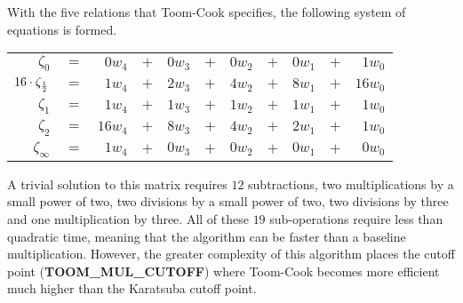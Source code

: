 \documentclass[b5paper]{book}
\begin{document}
With the five relations that Toom-Cook specifies, the following system of equations is formed.

\begin{center}
\begin{tabular}{rcrcrcrcrcr}
$\zeta_0$                    & $=$ & $0w_4$ & $+$ & $0w_3$ & $+$ & $0w_2$ & $+$ & $0w_1$ & $+$ & $1w_0$  \\
$16 \cdot \zeta_{1 \over 2}$ & $=$ & $1w_4$ & $+$ & $2w_3$ & $+$ & $4w_2$ & $+$ & $8w_1$ & $+$ & $16w_0$  \\
$\zeta_1$                    & $=$ & $1w_4$ & $+$ & $1w_3$ & $+$ & $1w_2$ & $+$ & $1w_1$ & $+$ & $1w_0$  \\
$\zeta_2$                    & $=$ & $16w_4$ & $+$ & $8w_3$ & $+$ & $4w_2$ & $+$ & $2w_1$ & $+$ & $1w_0$  \\
$\zeta_{\infty}$             & $=$ & $1w_4$ & $+$ & $0w_3$ & $+$ & $0w_2$ & $+$ & $0w_1$ & $+$ & $0w_0$  \\
\end{tabular}
\end{center}

A trivial solution to this matrix requires $12$ subtractions, two multiplications by a small power of two, two divisions by a small power
of two, two divisions by three and one multiplication by three.  All of these $19$ sub-operations require less than quadratic time, meaning that
the algorithm can be faster than a baseline multiplication.  However, the greater complexity of this algorithm places the cutoff point
(\textbf{TOOM\_MUL\_CUTOFF}) where Toom-Cook becomes more efficient much higher than the Karatsuba cutoff point.  
\end{document}
